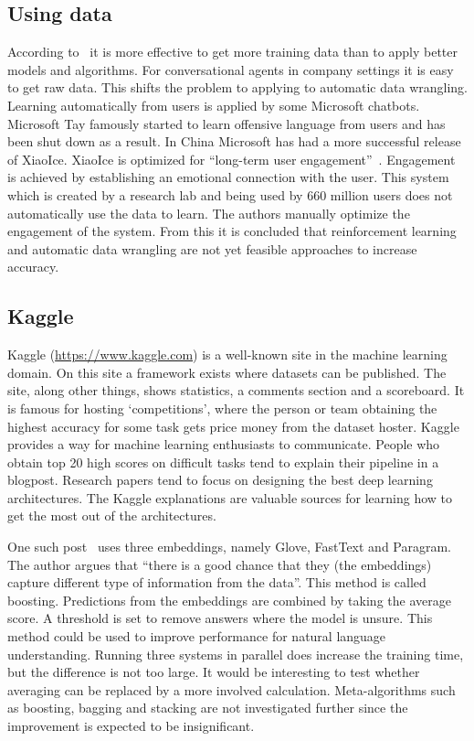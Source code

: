 \subsection{Using data}
\label{subsec:using_data}
According to~\citet{warden2018} it is more effective to get more training data than to apply better models and algorithms.
For conversational agents in company settings it is easy to get raw data.
This shifts the problem to applying to automatic data wrangling.
Learning automatically from users is applied by some Microsoft chatbots.
Microsoft Tay famously started to learn offensive language from users and has been shut down as a result.
In China Microsoft has had a more successful release of XiaoIce.
XiaoIce is optimized for ``long-term user engagement''~\citep{zhou2018design}.
Engagement is achieved by establishing an emotional connection with the user.
This system which is created by a research lab and being used by 660 million users does not automatically use the data to learn.
The authors manually optimize the engagement of the system.
From this it is concluded that reinforcement learning and automatic data wrangling are not yet feasible approaches to increase accuracy.

\subsection{Kaggle}
\label{subsec:kaggle}
Kaggle (\url{https://www.kaggle.com}) is a well-known site in the machine learning domain.
On this site a framework exists where datasets can be published.
The site, along other things, shows statistics, a comments section and a scoreboard.
It is famous for hosting `competitions', where the person or team obtaining the highest accuracy for some task gets price money from the dataset hoster.
Kaggle provides a way for machine learning enthusiasts to communicate.
People who obtain top 20 high scores on difficult tasks tend to explain their pipeline in a blogpost.
Research papers tend to focus on designing the best deep learning architectures.
The Kaggle explanations are valuable sources for learning how to get the most out of the architectures.

One such post~\citep{kumar2018} uses three embeddings, namely Glove, FastText and Paragram.
The author argues that ``there is a good chance that they (the embeddings) capture different type of information from the data''.
This method is called boosting.
Predictions from the embeddings are combined by taking the average score.
A threshold is set to remove answers where the model is unsure.
This method could be used to improve performance for natural language understanding.
Running three systems in parallel does increase the training time, but the difference is not too large.
It would be interesting to test whether averaging can be replaced by a more involved calculation.
Meta-algorithms such as boosting, bagging and stacking are not investigated further since the improvement is expected to be insignificant.

